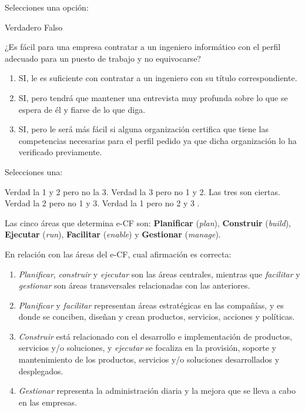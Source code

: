 \documentclass[a4paper,answers]{exam}
\begin{document}
\begin{questions}
  
  Selecciones una opción:

  \begin{choices}
    \CorrectChoice Verdadero
    \choice Falso
  \end{choices}

\question ¿Es fácil para una empresa contratar a un ingeniero
  informático con el perfil adecuado para un puesto de trabajo y no
  equivocarse?

  \begin{enumerate}
  \item SI, le es suficiente con contratar a un  ingeniero con su título correspondiente.
  \item SI, pero   tendrá que mantener una entrevista muy profunda sobre lo que se espera de él  y fiarse de lo que diga.
  \item SI, pero le será más fácil si alguna organización certifica que tiene las competencias necesarias para  el perfil pedido ya que dicha organización lo ha verificado previamente.
  \end{enumerate}

  
  Selecciones una:
  
  \begin{choices}
    \choice Verdad la 1 y 2 pero no la 3.
    \CorrectChoice Verdad la 3 pero no 1 y 2.
    \choice Las tres son ciertas.
    \choice Verdad  la  2 pero no 1 y 3.
    \choice Verdad  la 1 pero no  2 y 3 .
  \end{choices}

\question Las cinco áreas que determina e-CF son:
  \textbf{Planificar} (\emph{plan}), \textbf{Construir}
  (\emph{build}), \textbf{Ejecutar} (\emph{run}), \textbf{Facilitar}
  (\emph{enable}) y \textbf{Gestionar} (\emph{manage}).

  En relación con las áreas del e-CF, cual afirmación es correcta:

  \begin{enumerate}
  \item \emph{Planificar}, \emph{construir} y \emph{ejecutar}
    son las áreas centrales, mientras que \emph{facilitar} y
    \emph{gestionar} son áreas transversales relacionadas con las
    anteriores.
  \item \emph{Planificar} y \emph{facilitar} representan áreas
    estratégicas en las compañías, y es donde se conciben, diseñan y
    crean productos, servicios, acciones y políticas.  
  \item \emph{Construir} está relacionado con el desarrollo e
    implementación de productos, servicios y/o soluciones, y
    \emph{ejecutar} se focaliza en la provisión, soporte y
    mantenimiento de los productos, servicios y/o soluciones
    desarrollados y desplegados.
  \item \emph{Gestionar} representa la administración diaria y la mejora que se lleva a cabo en las empresas.  
  \end{enumerate}


\end{questions}
\end{document}
